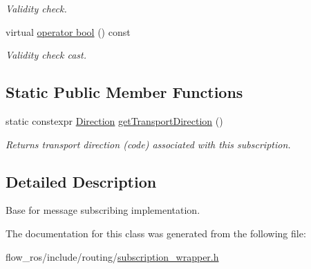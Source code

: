 \begin{DoxyCompactItemize}
\begin{DoxyCompactList}\small\item\em Validity check. \end{DoxyCompactList}\item 
\mbox{\label{classflow__ros_1_1routing_1_1_subscription_wrapper_a6869138ff591ba2ea7b2c81f2ad0ef89}} 
virtual \hyperlink{classflow__ros_1_1routing_1_1_subscription_wrapper_a6869138ff591ba2ea7b2c81f2ad0ef89}{operator bool} () const
\begin{DoxyCompactList}\small\item\em Validity check cast. \end{DoxyCompactList}\end{DoxyCompactItemize}
\subsection*{Static Public Member Functions}
\begin{DoxyCompactItemize}
\item 
\mbox{\label{classflow__ros_1_1routing_1_1_subscription_wrapper_a1a5c5359666278e172d50a8dde94b77f}} 
static constexpr \hyperlink{transport__info_8h_acb4b6ac875de32a0d0ee8cec235f7752}{Direction} \hyperlink{classflow__ros_1_1routing_1_1_subscription_wrapper_a1a5c5359666278e172d50a8dde94b77f}{get\+Transport\+Direction} ()
\begin{DoxyCompactList}\small\item\em Returns transport direction (code) associated with this subscription. \end{DoxyCompactList}\end{DoxyCompactItemize}


\subsection{Detailed Description}
Base for message subscribing implementation. 

The documentation for this class was generated from the following file\+:\begin{DoxyCompactItemize}
\item 
flow\+\_\+ros/include/routing/\hyperlink{subscription__wrapper_8h}{subscription\+\_\+wrapper.\+h}\end{DoxyCompactItemize}
